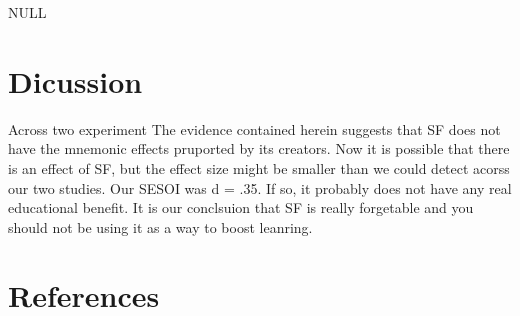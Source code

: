 \documentclass[pdf]{apa6}
\begin{document}
NULL

\hypertarget{dicussion}{%
\section{Dicussion}\label{dicussion}}

Across two experiment
The evidence contained herein suggests that SF does not have the mnemonic effects pruported by its creators. Now it is possible that there is an effect of SF, but the effect size might be smaller than we could detect acorss our two studies. Our SESOI was d = .35. If so, it probably does not have any real educational benefit. It is our conclsuion that SF is really forgetable and you should not be using it as a way to boost leanring.

\newpage

\hypertarget{references}{%
\section{References}\label{references}}

\begingroup
\setlength{\parindent}{-0.5in}
\setlength{\leftskip}{0.5in}

\hypertarget{refs}{}

\endgroup
\end{document}
